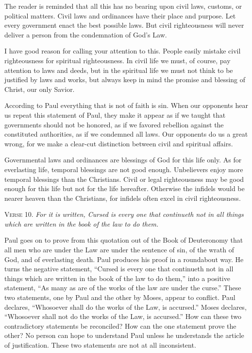 The reader is reminded that all this has no bearing upon civil laws, customs, or political matters. Civil laws and ordinances have their place and purpose. Let every government enact the best possible laws. But civil righteousness will never deliver a person from the condemnation of God’s Law.

I have good reason for calling your attention to this. People easily mistake civil righteousness for spiritual righteousness. In civil life we must, of course, pay attention to laws and deeds, but in the spiritual life we must not think to be justified by laws and works, but always keep in mind the promise and blessing of Christ, our only Savior.

According to Paul everything that is not of faith is sin. When our opponents hear us repeat this statement of Paul, they make it appear as if we taught that governments should not be honored, as if we favored rebellion against the constituted authorities, as if we condemned all laws. Our opponents do us a great wrong, for we make a clear-cut distinction between civil and spiritual affairs.

Governmental laws and ordinances are blessings of God for this life only. As for everlasting life, temporal blessings are not good enough. Unbelievers enjoy more temporal blessings than the Christians. Civil or legal righteousness may be good enough for this life but not for the life hereafter. Otherwise the infidels would be nearer heaven than the Christians, for infidels often excel in civil righteousness.

\textsc{Verse} 10. \emph{For it is written, Cursed is every one that continueth not in all things which are written in the book of the law to do them.}

Paul goes on to prove from this quotation out of the Book of Deuteronomy that all men who are under the Law are under the sentence of sin, of the wrath of God, and of everlasting death. Paul produces his proof in a roundabout way. He turns the negative statement, “Cursed is every one that continueth not in all things which are written in the book of the law to do them,” into a positive statement, “As many as are of the works of the law are under the curse.” These two statements, one by Paul and the other by Moses, appear to conflict. Paul declares, “Whosoever shall do the works of the Law, is accursed.” Moses declares, “Whosoever shall not do the works of the Law, is accursed.” How can these two contradictory statements be reconciled? How can the one statement prove the other? No person can hope to understand Paul unless he understands the article of justification. These two statements are not at all inconsistent.

